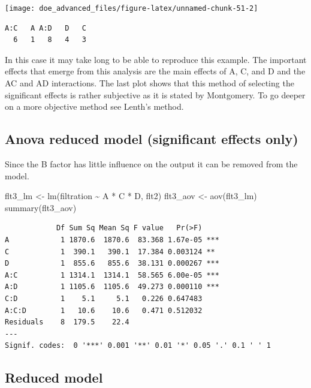 \documentclass[
]{book}
\newenvironment{Shaded}{\begin{snugshade}}{\end{snugshade}}
\newcommand{\FunctionTok}[1]{\textcolor[rgb]{0.00,0.00,0.00}{#1}}
\newcommand{\NormalTok}[1]{#1}
\newcommand{\OtherTok}[1]{\textcolor[rgb]{0.56,0.35,0.01}{#1}}
\newcommand{\SpecialCharTok}[1]{\textcolor[rgb]{0.00,0.00,0.00}{#1}}
\begin{document}
\texttt{[image: doe\_advanced\_files/figure-latex/unnamed-chunk-51-2]}

\begin{verbatim}
A:C   A A:D   D   C 
  6   1   8   4   3 
\end{verbatim}

In this case it may take long to be able to reproduce this example.
The important effects that emerge from this analysis are the main effects of A, C, and D and the AC and AD interactions.
The last plot shows that this method of selecting the significant effects is rather subjective as it is stated by Montgomery. To go deeper on a more objective method see Lenth's method.

\hypertarget{anova-reduced-model-significant-effects-only}{%
\subsection{Anova reduced model (significant effects only)}\label{anova-reduced-model-significant-effects-only}}

Since the B factor has little influence on the output it can be removed from the model.

\begin{Shaded}
\begin{Highlighting}[]
\NormalTok{flt3\_lm }\OtherTok{\textless{}{-}} \FunctionTok{lm}\NormalTok{(filtration }\SpecialCharTok{\textasciitilde{}}\NormalTok{ A }\SpecialCharTok{*}\NormalTok{ C }\SpecialCharTok{*}\NormalTok{ D, flt2)}
\NormalTok{flt3\_aov }\OtherTok{\textless{}{-}} \FunctionTok{aov}\NormalTok{(flt3\_lm)}
\FunctionTok{summary}\NormalTok{(flt3\_aov)}
\end{Highlighting}
\end{Shaded}

\begin{verbatim}
            Df Sum Sq Mean Sq F value   Pr(>F)    
A            1 1870.6  1870.6  83.368 1.67e-05 ***
C            1  390.1   390.1  17.384 0.003124 ** 
D            1  855.6   855.6  38.131 0.000267 ***
A:C          1 1314.1  1314.1  58.565 6.00e-05 ***
A:D          1 1105.6  1105.6  49.273 0.000110 ***
C:D          1    5.1     5.1   0.226 0.647483    
A:C:D        1   10.6    10.6   0.471 0.512032    
Residuals    8  179.5    22.4                     
---
Signif. codes:  0 '***' 0.001 '**' 0.01 '*' 0.05 '.' 0.1 ' ' 1
\end{verbatim}

\hypertarget{reduced-model}{%
\subsection{Reduced model}\label{reduced-model}}
\end{document}
